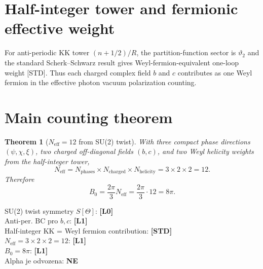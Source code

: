 \documentclass[12pt,a4paper]{article}
\newtheorem{theorem}[lemma]{Theorem}
\begin{document}
\section{Half-integer tower and fermionic effective weight}
For anti-periodic KK tower \((n+1/2)/R\), the partition-function sector is
\(\vartheta_2\) and the standard Scherk--Schwarz result gives Weyl-fermion-equivalent one-loop weight [STD].
Thus each charged complex field \(b\) and \(c\) contributes as one Weyl fermion in the effective photon vacuum polarization counting.

\section{Main counting theorem}
\begin{theorem}[\(N_{\mathrm{eff}}=12\) from SU(2) twist]
With three compact phase directions \((\psi,\chi,\xi)\), two charged off-diagonal fields \((b,c)\), and two Weyl helicity weights from the half-integer tower,
\[
N_{\mathrm{eff}}=N_{\mathrm{phases}}\times N_{\mathrm{charged}}\times N_{\mathrm{helicity}}
=3\times2\times2=12.
\]
Therefore
\[
B_0=\frac{2\pi}{3}N_{\mathrm{eff}}=\frac{2\pi}{3}\cdot12=8\pi.
\]
\end{theorem}

\begin{statusbox}
SU(2) twist symmetry \(S[\Theta]\): \textbf{[L0]}\\
Anti-per. BC pro \(b,c\): \textbf{[L1]}\\
Half-integer KK = Weyl fermion contribution: \textbf{[STD]}\\
\(N_{\mathrm{eff}} = 3\times2\times2 = 12\): \textbf{[L1]}\\
\(B_0 = 8\pi\): \textbf{[L1]}\\
Alpha je odvozena: \textbf{NE}
\end{statusbox}
\end{document}
